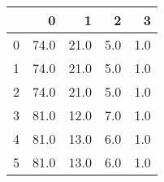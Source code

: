 \begin{tabular}{lrrrr}
\toprule
{} &     0 &     1 &    2 &    3 \\
\midrule
0 &  74.0 &  21.0 &  5.0 &  1.0 \\
1 &  74.0 &  21.0 &  5.0 &  1.0 \\
2 &  74.0 &  21.0 &  5.0 &  1.0 \\
3 &  81.0 &  12.0 &  7.0 &  1.0 \\
4 &  81.0 &  13.0 &  6.0 &  1.0 \\
5 &  81.0 &  13.0 &  6.0 &  1.0 \\
\bottomrule
\end{tabular}
